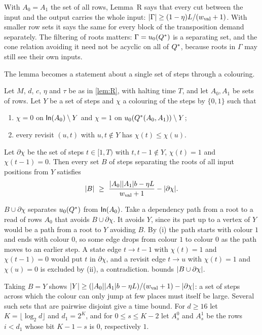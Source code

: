 With $A_0=A_1$ the set of all rows, Lemma~R says that every cut between the input and the output carries the whole input:
$\lvert \Gamma \rvert\ge(1-\eta)L/(w_{\mathrm{val}}+1)$. With smaller row sets it says the same for every block of the transposition demand separately. The
filtering of roots matters: $\Gamma=u_0(Q^{*})$ is a separating set, and the cone relation avoiding it need not be acyclic on all of
$Q^{*}$, because roots in $\Gamma$ may still see their own inputs.

The lemma becomes a statement about a single set of steps through a colouring.

\begin{theorem}\label{thm:colouring}
Let $M$, $d$, $c$, $\eta$ and $\tau$ be as in \cref{lem:R}, with halting time $T$, and let $A_0,A_1$ be sets of rows. Let $Y$ be a set of
steps and $\chi$ a colouring of the steps by $\{0,1\}$ such that
\begin{enumerate}[label=(\roman*)]
\item $\chi=0$ on $\mathsf{In}(A_0)\setminus Y$ and $\chi=1$ on $u_0(Q^{*}(A_0,A_1))\setminus Y$;
\item every revisit $(u,t)$ with $u,t\notin Y$ has $\chi(t)\le\chi(u)$.
\end{enumerate}
Let $\partial\chi$ be the set of steps $t\in[1,T)$ with $t,t-1\notin Y$, $\chi(t)=1$ and $\chi(t-1)=0$. Then every set $B$ of steps separating
the roots of all input positions from $Y$ satisfies
\[
  \abs B\ \ge\ \frac{\abs{A_0}\abs{A_1}b-\eta L}{\wval+1}-\abs{\partial\chi}.
\]
\end{theorem}

\begin{outline}
$B\cup\partial\chi$ separates $u_0(Q^{*})$ from $\mathsf{In}(A_0)$. Take a dependency path from a root to a read of rows $A_0$ that avoids
$B\cup\partial\chi$. It avoids $Y$, since its part up to a vertex of $Y$ would be a path from a root to $Y$ avoiding $B$. By (i) the path
starts with colour $1$ and ends with colour $0$, so some edge drops from colour $1$ to colour $0$ as the path moves to an earlier step. A
state edge $t\to t-1$ with $\chi(t)=1$ and $\chi(t-1)=0$ would put $t$ in $\partial\chi$, and a revisit edge $t\to u$ with $\chi(t)=1$ and
$\chi(u)=0$ is excluded by (ii), a contradiction.  bounds $\lvert B\cup\partial\chi \rvert$.
\end{outline}

Taking $B=Y$ shows $\lvert Y \rvert\ge(\lvert A_0 \rvert\lvert A_1 \rvert b-\eta L)/(w_{\mathrm{val}}+1)-\lvert \partial\chi \rvert$: a set of steps across which the colour can only
jump at few places must itself be large. Several such sets that are pairwise disjoint give a time bound. For $d\ge16$ let $K=\lfloor
\log_2d\rfloor$ and $d_1=2^K$, and for $0\le s\le K-2$ let $A_s^0$ and $A_s^1$ be the rows $i<d_1$ whose bit $K-1-s$ is $0$, respectively $1$.

